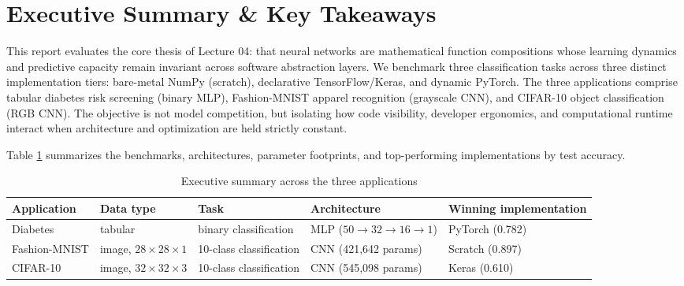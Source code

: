 \documentclass[11pt]{article}
\begin{document}
\section{Executive Summary \& Key Takeaways}

This report evaluates the core thesis of Lecture 04: that neural networks are mathematical function compositions whose learning dynamics and predictive capacity remain invariant across software abstraction layers. We benchmark three classification tasks across three distinct implementation tiers: bare-metal NumPy (scratch), declarative TensorFlow/Keras, and dynamic PyTorch. The three applications comprise tabular diabetes risk screening (binary MLP), Fashion-MNIST apparel recognition (grayscale CNN), and CIFAR-10 object classification (RGB CNN). The objective is not model competition, but isolating how code visibility, developer ergonomics, and computational runtime interact when architecture and optimization are held strictly constant.

Table \ref{tab:exec-summary} summarizes the benchmarks, architectures, parameter footprints, and top-performing implementations by test accuracy.

\begin{table}[H]
\centering
\caption{Executive summary across the three applications}
\label{tab:exec-summary}
\small
\begin{tabular}{@{}p{2.2cm}p{2.4cm}p{2.6cm}p{2.9cm}p{2.6cm}@{}}
\toprule
Application & Data type & Task & Architecture & Winning implementation \\
\midrule
Diabetes & tabular & binary classification & MLP ($50 \to 32 \to 16 \to 1$) & PyTorch (0.782) \\
Fashion-MNIST & image, $28\times28\times1$ & 10-class classification & CNN (421,642 params) & Scratch (0.897) \\
CIFAR-10 & image, $32\times32\times3$ & 10-class classification & CNN (545,098 params) & Keras (0.610) \\
\bottomrule
\end{tabular}
\end{table}
\end{document}
